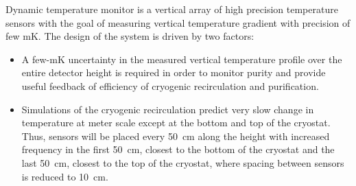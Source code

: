 Dynamic temperature monitor is a vertical array of high precision temperature sensors with the goal of measuring vertical temperature gradient with precision of few \si{mK}. The design of the system is driven by two factors:
\begin{itemize}
\item
A few-\si{mK} uncertainty in the measured vertical temperature profile over the entire detector height is required in order to monitor \lar purity and provide useful feedback of efficiency of cryogenic recirculation and purification.
\item
Simulations of the cryogenic recirculation predict very slow change in temperature at meter scale except at the bottom and top of the cryostat. Thus, sensors will be placed every \SI{50}{cm} along the  height with increased frequency in the first \SI{50}{cm}, closest to the bottom of the cryostat and the last \SI{50}{cm}, closest to the top of the cryostat, where spacing between sensors is reduced to \SI{10}{cm}.
 \end{itemize}



